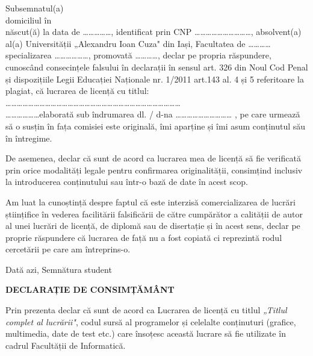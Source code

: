 \documentclass[12pt,a4paper]{report}
\begin{document}
Subsemnatul(a) \dotfill\\
domiciliul \dotfill în \dotfill\\
\dotfill născut(ă) la data de \ldots\ldots\ldots\ldots\ldots, identificat prin CNP \ldots\ldots\ldots\ldots\ldots\ldots\ldots\ldots\ldots\ldots, absolvent(a) al(a) Universității „Alexandru Ioan Cuza" din Iași, Facultatea de \ldots\ldots\ldots\ldots specializarea \ldots\ldots\ldots\ldots\ldots\ldots, promovată \ldots\ldots\ldots\ldots, declar pe propria răspundere, cunoscând consecințele falsului în declarații în sensul art. 326 din Noul Cod Penal și dispozițiile Legii Educației Naționale nr. 1/2011 art.143 al. 4 și 5 referitoare la plagiat, că lucrarea de licență cu titlul:\\
\ldots\ldots\ldots\ldots\ldots\ldots\ldots\ldots\ldots\ldots\ldots\ldots\ldots\ldots\ldots\ldots\ldots\ldots\ldots\ldots\ldots\ldots\ldots\ldots\ldots\ldots\ldots\ldots\ldots\ldots\ldots
\\
\ldots\ldots\ldots\ldots\ldots\ldots elaborată sub îndrumarea dl. / d-na \ldots\ldots\ldots\ldots\ldots\ldots\ldots\ldots\ldots\ldots
, pe care urmează să o susțin în fața comisiei este originală, îmi aparține și îmi asum conținutul său în întregime.

De asemenea, declar că sunt de acord ca lucrarea mea de licență să fie verificată prin orice modalități legale pentru confirmarea originalității, consimțind inclusiv la introducerea conținutului sau într-o bază de date în acest scop.

Am luat la cunoștință despre faptul că este interzisă comercializarea de lucrări științifice în vederea facilitării falsificării de către cumpărător a calității de autor al unei lucrări de licență, de diplomă sau de disertație și în acest sens, declar pe proprie răspundere că lucrarea de față nu a fost copiată ci reprezintă rodul cercetării pe care am întreprins-o.\vspace{1cm}

Dată azi, \dotfill \hspace{5cm} Semnătura student \dotfill

\vspace{2cm}

\newpage
\begin{center}
\textbf{DECLARAȚIE DE CONSIMȚĂMÂNT}
\end{center}

\vspace{1cm}

Prin prezenta declar că sunt de acord ca Lucrarea de licență cu titlul \textit{„Titlul complet al lucrării"}, codul sursă al programelor și celelalte conținuturi (grafice, multimedia, date de test etc.) care însoțesc această lucrare să fie utilizate în cadrul Facultății de Informatică.
\end{document}
